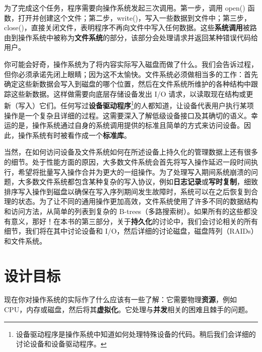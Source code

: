 为了完成这个任务，程序需要向操作系统发起三次调用。第一步，调用 open() 函数，打开并创建这个文件；第二步，write()，写入一些数据到文件中；第三步，close()，直接关闭文件，表明程序不再向文件中写入任何数据。这些\textbf{系统调用}被路由到操作系统中被称为\textbf{文件系统}的部分，该部分会处理请求并返回某种错误代码给用户。

你可能会好奇，操作系统为了将内容实际写入磁盘而做了什么。我们会告诉过程，但你必须承诺先闭上眼睛；因为这不太愉快。文件系统必须做相当多的工作：首先确定这些新数据会写入到磁盘的哪个位置，然后在文件系统所维护的各种结构中跟踪这些新数据。这样做需要向底层存储设备发出 I/O 请求，以读取现在结构或更新（写入）它们。任何写过\textbf{设备驱动程序}\footnote{设备驱动程序是操作系统中知道如何处理特殊设备的代码。稍后我们会详细的讨论设备和设备驱动程序。}的人都知道，让设备代表用户执行某项操作是一个复杂且详细的过程。这需要深入了解低级设备接口及其确切的语义。幸运的是，操作系统通过自身的系统调用提供的标准且简单的方式来访问设备。因此，操作系统有时被看作成一个\textbf{标准库}。

当然，在如何访问设备及文件系统如何在所述设备上持久化的管理数据上还有很多的细节。处于性能方面的原因，大多数文件系统会首先将写入操作延迟一段时间执行，希望将批量写入操作合并为更大的一组操作。为了处理写入期间系统崩溃的问题，大多数文件系统都包含某种复杂的写入协议，例如\textbf{日志记录}或\textbf{写时复制}，细致排序写入操作到磁盘以确保在写入序列期间发生故障时，系统可以在之后恢复到合理的状态。为了让不同的通用操作更加高效，文件系统使用了许多不同的数据结构和访问方法，从简单的列表到复杂的 B-trees（多路搜索树）。如果所有的这些都没有意义，那好！在本书的第三部分，关于\textbf{持久化}的讨论中，我们会讨论相关的所有细节，我们将在其中讨论设备和 I/O，然后详细的讨论磁盘，磁盘阵列（RAIDs）和文件系统。

\section{设计目标}
现在你对操作系统的实际作了什么应该有一些了解：它需要物理\textbf{资源}，例如 CPU，内存或磁盘，然后将其\textbf{虚拟化}。它处理与\textbf{并发}相关的困难且棘手的问题。